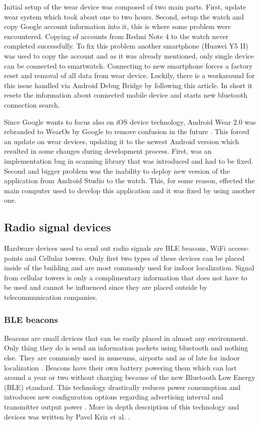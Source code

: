 Initial setup of the wear device was composed of two main parts. First, update wear system which took about one to two hours. Second, setup the watch and copy Google account information into it, this is where some problem were encountered. Copying of accounts from Redmi Note 4 to the watch never completed successfully. To fix this problem another smartphone (Huawei Y5 II) was used to copy the account and as it was already mentioned, only single device can be connected to smartwatch. Connecting to new smartphone forces a factory reset and removal of all data from wear device. Luckily, there is a workaround for this issue handled via Android Debug Bridge by following this \cite{HtPAWW} article. In short it resets the information about connected mobile device and starts new bluetooth connection search.

Since Google wants to focus also on iOS device technology, Android Wear 2.0 was rebranded to WearOs by Google to remove confusion in the future \cite{AWITFNM}. This forced an update on wear devices, updating it to the newest Android version which resulted in some changes during development process. First, was an implementation bug in scanning library that was introduced and had to be fixed. Second and bigger problem was the inability to deploy new version of the application from Android Studio to the watch. This, for some reason, effected the main computer used to develop this application and it was fixed by using another one.

\subsection{Radio signal devices}\label{subsec:RSD}
Hardware devices used to send out radio signals are BLE beacons, WiFi access-points and Cellular towers. Only first two types of these devices can be placed inside of the building and are most commonly used for indoor localization. Signal from cellular towers is only a complimentary information that does not have to be used and cannot be influenced since they are placed outside by telecommunication companies.

\subsubsection{BLE beacons}\label{subsec:BLEBeacons}
Beacons are small devices that can be easily placed in almost any environment. Only thing they do is send an information packets using bluetooth and nothing else. They are commonly used in museums, airports and as of late for indoor localization \cite{10TABB}. Beacons have their own battery powering them which can last around a year or two without charging because of the new Bluetooth Low Energy (BLE) standard. This technology drastically reduces power consumption and introduces new configuration options regarding advertising interval and transmitter output power \cite{IPSBOBLE}. More in depth description of this technology and devices was written by Pavel Kriz et al. \cite{IILUBLEB}.

